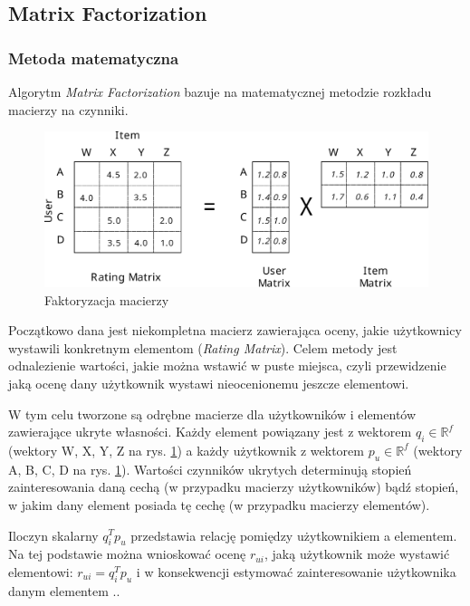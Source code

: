 \documentclass[twoside]{iisthesis}
\begin{document}
		 \subsection{Matrix Factorization}
		
		 \subsubsection{Metoda matematyczna}	
	
		 Algorytm \textit{Matrix Factorization} bazuje na matematycznej metodzie rozkładu macierzy na czynniki.
	
	
			  \begin{figure}[!ht] 
			  	\centering
			  	\includegraphics[width=1\textwidth]{factorization}
			  	\caption{Faktoryzacja macierzy \protect\cite{id:ComputingRecommendationsExtremeScaleApacheFlink}}
			  	\label{fig:factorization}
			  \end{figure}
			 
		Początkowo dana jest niekompletna macierz zawierająca oceny, jakie użytkownicy wystawili konkretnym elementom (\textit{Rating Matrix}). Celem metody jest odnalezienie wartości, jakie można wstawić w puste miejsca, czyli przewidzenie jaką ocenę dany użytkownik wystawi nieocenionemu jeszcze elementowi. 		
		
		W tym celu tworzone są odrębne macierze dla użytkowników i elementów zawierające ukryte własności. Każdy element powiązany jest z wektorem $q_i \in \mathbb{R} ^f$ (wektory W, X, Y, Z na rys. \ref{fig:factorization}) a każdy użytkownik z wektorem $p_u \in \mathbb{R} ^f$ (wektory A, B, C, D na rys. \ref{fig:factorization}). Wartości czynników ukrytych determinują stopień zainteresowania daną cechą (w przypadku macierzy użytkowników) bądź stopień, w jakim dany element posiada tę cechę (w przypadku macierzy elementów).		
		
		Iloczyn skalarny $q_i^T p_u$ przedstawia relację pomiędzy użytkownikiem a elementem. Na tej podstawie można wnioskować ocenę $r_{ui}$, jaką użytkownik może wystawić elementowi: $r_{ui} = q_i^T p_u$ i w konsekwencji estymować zainteresowanie użytkownika danym elementem \cite{koren2009matrix}..
		
\end{document}
